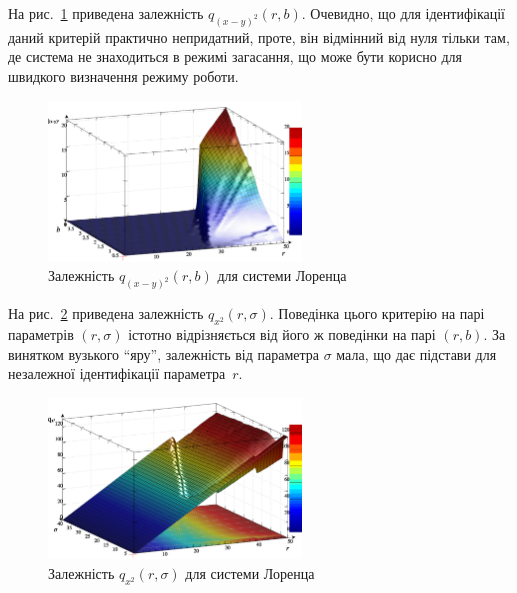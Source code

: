 На рис.~\ref{atu:f:lor_qxmy2_r_b} приведена залежність
$q_{(x-y)^2}(r,b)$.
Очевидно, що для ідентифікації даний критерій практично
непридатний, проте, він відмінний від нуля тільки там, де система
не знаходиться в режимі загасання, що може бути корисно для
швидкого визначення режиму роботи.

\begin{figure}[htb!]
  \begin{center}
    \includegraphics[width=0.60\textwidth]{p/cha/lor/q2d/lor_qxmy2_r_b.png}
  \end{center}
  \caption{Залежність $ q_{(x-y)^2} (r, b) $ для системи Лоренца}
  \label{atu:f:lor_qxmy2_r_b}
\end{figure}


На рис.~\ref{atu:f:lor_qx2_r_sigma} приведена залежність
$q_{x^2}(r,\sigma)$.
Поведінка цього критерію на парі параметрів
$(r, \sigma) $ істотно відрізняється від його ж поведінки на парі
$(r, b) $. За винятком вузького ``яру'', залежність від параметра
$\sigma $ мала, що дає підстави для незалежної ідентифікації
параметра~$r$.

\begin{figure}[htb!]
  \begin{center}
    \includegraphics[width=0.60\textwidth]{p/cha/lor/q2d/lor_qx2_r_sigma.png}
  \end{center}
  \caption{Залежність $ q_{x^2} (r, \sigma) $ для системи Лоренца}
  \label{atu:f:lor_qx2_r_sigma}
\end{figure}


